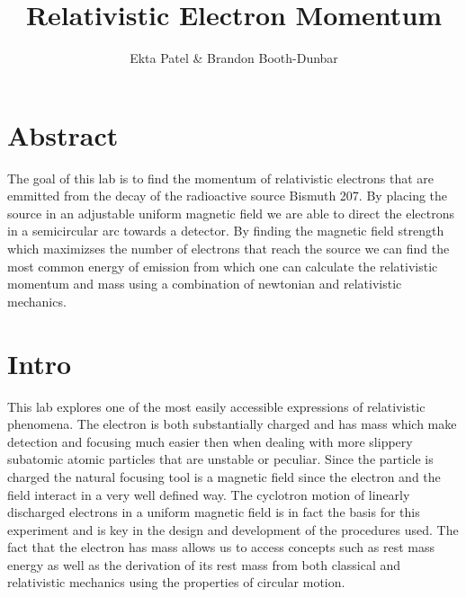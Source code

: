 


\newcommand{\ig}[2][width=4in]{\texttt{[image: \#2]}}    		
\usepackage{graphicx}					
\usepackage{amssymb}
\usepackage{pgfplotstable}
\usepackage{float}
\usepackage{caption}
\captionsetup[table]{justification=justified,singlelinecheck=false, position=bottom}


\header {\today}							
\title{Relativistic Electron Momentum}
\author{Ekta Patel \& Brandon Booth-Dunbar}



\section{Abstract}
\begin{em}
The goal of this lab is to find the momentum of relativistic electrons that are emmitted from the decay of the radioactive source Bismuth 207.  By placing the source in an adjustable uniform magnetic field we are  able to direct the electrons in a semicircular arc towards a detector.  By finding the magnetic field strength which maximizses the number of electrons that reach the source we can find the most common energy of emission from which one can calculate the relativistic  momentum and mass using a combination of newtonian and relativistic mechanics. 
\end{em}

\section{Intro}
This lab explores one of the most easily accessible expressions of relativistic phenomena. The electron is both substantially charged and has mass which make detection and focusing much  easier then when dealing with more slippery subatomic  atomic particles that are unstable or peculiar.  Since the particle is charged the natural focusing tool is a magnetic field since the electron and the field interact in a very well defined way. The cyclotron motion of linearly discharged electrons in a uniform magnetic field is in fact the basis for this experiment and is key in the design and development of the procedures used. The fact that the  electron has mass allows us to access concepts such as rest mass energy as well as the derivation of its rest mass from both classical and relativistic mechanics using the properties of circular motion.  

